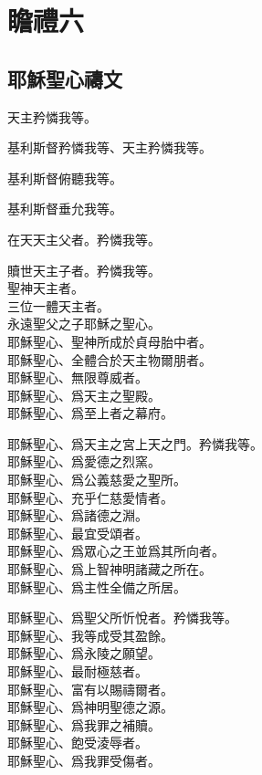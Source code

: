 \chapter[瞻禮六]{瞻禮六}
\section{耶穌聖心禱文}
\versicle 天主矜憐我等。

\Response 基利斯督矜憐我等、天主矜憐我等。

\versicle 基利斯督俯聽我等。

\Response 基利斯督垂允我等。

\versicle 在天天主父者。\hfill \response 矜憐我等。

\versicle 贖世天主子者。\hfill \response 矜憐我等。\\
聖神天主者。\\
三位一體天主者。\\
永遠聖父之子耶穌之聖心。\\
耶穌聖心、聖神所成於貞母胎中者。\\
耶穌聖心、全體合於天主物爾朋者。\\
耶穌聖心、無限尊威者。\\
耶穌聖心、爲天主之聖殿。\\
耶穌聖心、爲至上者之幕府。

\versicle 耶穌聖心、爲天主之宮上天之門。\hfill \response 矜憐我等。\\
耶穌聖心、爲愛德之烈窯。\\
耶穌聖心、爲公義慈愛之聖所。\\
耶穌聖心、充乎仁慈愛情者。\\
耶穌聖心、爲諸德之淵。\\
耶穌聖心、最宜受頌者。\\
耶穌聖心、爲眾心之王並爲其所向者。\\
耶穌聖心、爲上智神明諸藏之所在。\\
耶穌聖心、爲主性全備之所居。

\versicle 耶穌聖心、爲聖父所忻悅者。\hfill \response 矜憐我等。\\
耶穌聖心、我等成受其盈餘。\\
耶穌聖心、爲永陵之願望。\\
耶穌聖心、最耐極慈者。\\
耶穌聖心、富有以賜禱爾者。\\
耶穌聖心、爲神明聖德之源。\\
耶穌聖心、爲我罪之補贖。\\
耶穌聖心、飽受淩辱者。\\
耶穌聖心、爲我罪受傷者。

